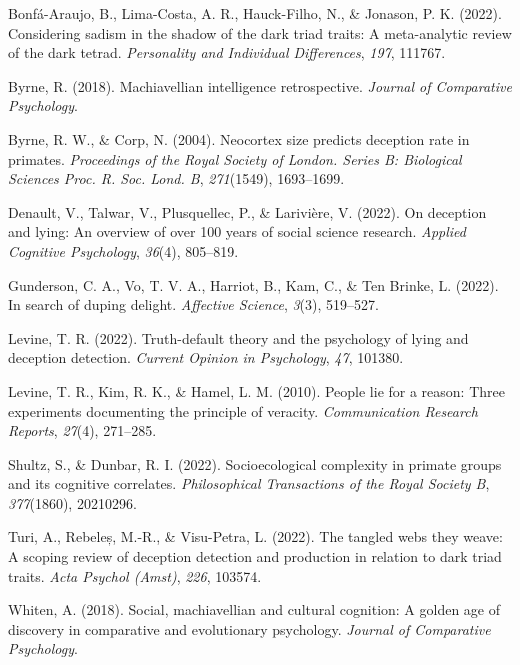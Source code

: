 \documentclass[
  letterpaper,
  DIV=11,
  numbers=noendperiod]{scrartcl}
\newlength{\cslhangindent}
\newlength{\cslentryspacingunit} %
\newenvironment{CSLReferences}[2] %
 {%
  \setlength{\parindent}{0pt}
  \ifodd #1
  \let\oldpar\par
  \def\par{\hangindent=\cslhangindent\oldpar}
  \fi
  \setlength{\parskip}{#2\cslentryspacingunit}
 }%
 {}
\begin{document}
\hypertarget{refs}{}
\begin{CSLReferences}{1}{0}
\leavevmode{}%
Bonfá-Araujo, B., Lima-Costa, A. R., Hauck-Filho, N., \& Jonason, P. K.
(2022). Considering sadism in the shadow of the dark triad traits: A
meta-analytic review of the dark tetrad. \emph{Personality and
Individual Differences}, \emph{197}, 111767.

\leavevmode{}%
Byrne, R. (2018). Machiavellian intelligence retrospective.
\emph{Journal of Comparative Psychology}.

\leavevmode{}%
Byrne, R. W., \& Corp, N. (2004). Neocortex size predicts deception rate
in primates. \emph{Proceedings of the Royal Society of London. Series B:
Biological Sciences Proc. R. Soc. Lond. B}, \emph{271}(1549),
1693--1699.

\leavevmode{}%
Denault, V., Talwar, V., Plusquellec, P., \& Larivière, V. (2022). On
deception and lying: An overview of over 100 years of social science
research. \emph{Applied Cognitive Psychology}, \emph{36}(4), 805--819.

\leavevmode{}%
Gunderson, C. A., Vo, T. V. A., Harriot, B., Kam, C., \& Ten Brinke, L.
(2022). In search of duping delight. \emph{Affective Science},
\emph{3}(3), 519--527.

\leavevmode{}%
Levine, T. R. (2022). Truth-default theory and the psychology of lying
and deception detection. \emph{Current Opinion in Psychology},
\emph{47}, 101380.

\leavevmode{}%
Levine, T. R., Kim, R. K., \& Hamel, L. M. (2010). People lie for a
reason: Three experiments documenting the principle of veracity.
\emph{Communication Research Reports}, \emph{27}(4), 271--285.

\leavevmode{}%
Shultz, S., \& Dunbar, R. I. (2022). Socioecological complexity in
primate groups and its cognitive correlates. \emph{Philosophical
Transactions of the Royal Society B}, \emph{377}(1860), 20210296.

\leavevmode{}%
Turi, A., Rebeleș, M.-R., \& Visu-Petra, L. (2022). The tangled webs
they weave: A scoping review of deception detection and production in
relation to dark triad traits. \emph{Acta Psychol (Amst)}, \emph{226},
103574.

\leavevmode{}%
Whiten, A. (2018). Social, machiavellian and cultural cognition: A
golden age of discovery in comparative and evolutionary psychology.
\emph{Journal of Comparative Psychology}.

\end{CSLReferences}
\end{document}
